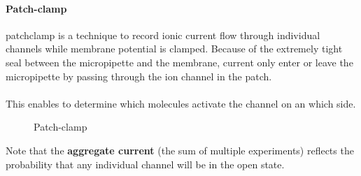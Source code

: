\documentclass[../main.tex]{subfiles}
\begin{document}
\paragraph{Patch-clamp}

\gls{patchclamp} is a technique to record ionic current flow through individual channels while membrane potential is clamped. Because of the extremely tight seal between the micropipette and the membrane, current only enter or leave the micropipette by passing through the ion channel in the patch.  \\
\\
This enables to determine which molecules activate the channel on an which side.  
\begin{figure}[H]
	\centering
	\caption{Patch-clamp}
	\label{patch-clamp}
\end{figure} 
Note that the \textbf{aggregate current} (the sum of multiple experiments) reflects the probability that any individual channel will be in the open state. 
\end{document}
